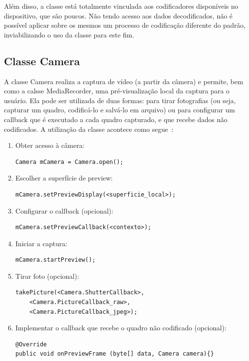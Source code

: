 \documentclass{acm_proc_article-sp}
\begin{document}
Além disso, a classe está totalmente vinculada aos codificadores disponíveis no dispositivo, que são poucos. Não tendo acesso aos dados decodificados, não é possível aplicar sobre os mesmos um processo de codificação diferente do padrão, inviabilizando o uso da classe para este fim.

\subsection{Classe Camera}\label{camera}
A classe Camera realiza a captura de vídeo (a partir da câmera) e permite, bem como a calsse MediaRecorder, uma pré-visualização local da captura para o usuário. Ela pode ser utilizada de duas formas: para tirar fotografias (ou seja, capturar um quadro, codificá-lo e salvá-lo em arquivo) ou para configurar um callback que é executado a cada quadro capturado, e que recebe dados não codificados. A utilização da classe acontece como segue~\cite{developers_android}:

\begin{enumerate}
 \item Obter acesso à câmera:
  \begin{lstlisting}
Camera mCamera = Camera.open();
  \end{lstlisting}
 \item Escolher a superfície de preview:
  \begin{lstlisting}
mCamera.setPreviewDisplay(<superficie_local>);
  \end{lstlisting}
 \item Configurar o callback (opcional):
  \begin{lstlisting}
mCamera.setPreviewCallback(<contexto>);
  \end{lstlisting}
 \item Iniciar a captura:
  \begin{lstlisting}
mCamera.startPreview();
  \end{lstlisting}
 \item Tirar foto (opcional):
  \begin{lstlisting}
takePicture(<Camera.ShutterCallback>,
    <Camera.PictureCallback_raw>,
    <Camera.PictureCallback_jpeg>);
  \end{lstlisting}
 \item Implementar o callback que recebe o quadro não codificado (opcional):
  \begin{lstlisting}
@Override
public void onPreviewFrame (byte[] data, Camera camera){}
  \end{lstlisting}
\end{enumerate}
\end{document}
